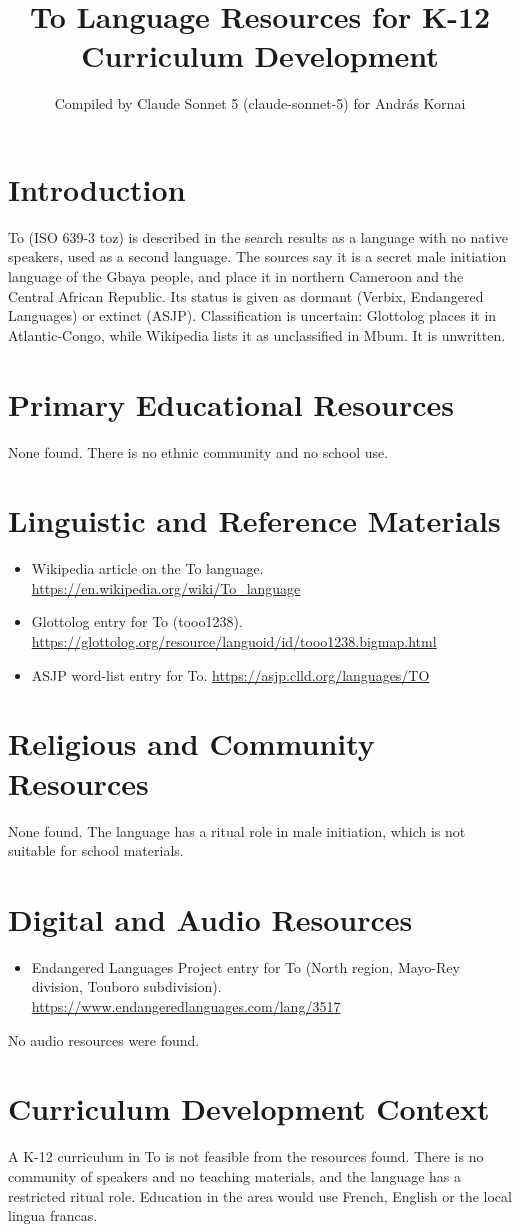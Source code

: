 \documentclass[12pt]{article}
\title{To Language Resources for K-12 Curriculum Development}
\author{Compiled by Claude Sonnet 5 (claude-sonnet-5) for Andr\'as Kornai}
\date{}
\begin{document}
\maketitle

\section{Introduction}
To (ISO 639-3 toz) is described in the search results as a language with no native speakers, used as a second language. The sources say it is a secret male initiation language of the Gbaya people, and place it in northern Cameroon and the Central African Republic. Its status is given as dormant (Verbix, Endangered Languages) or extinct (ASJP). Classification is uncertain: Glottolog places it in Atlantic-Congo, while Wikipedia lists it as unclassified in Mbum. It is unwritten.

\section{Primary Educational Resources}
None found. There is no ethnic community and no school use.

\section{Linguistic and Reference Materials}
\begin{itemize}
\item Wikipedia article on the To language. \url{https://en.wikipedia.org/wiki/To_language}
\item Glottolog entry for To (tooo1238). \url{https://glottolog.org/resource/languoid/id/tooo1238.bigmap.html}
\item ASJP word-list entry for To. \url{https://asjp.clld.org/languages/TO}
\end{itemize}

\section{Religious and Community Resources}
None found. The language has a ritual role in male initiation, which is not suitable for school materials.

\section{Digital and Audio Resources}
\begin{itemize}
\item Endangered Languages Project entry for To (North region, Mayo-Rey division, Touboro subdivision). \url{https://www.endangeredlanguages.com/lang/3517}
\end{itemize}
No audio resources were found.

\section{Curriculum Development Context}
A K-12 curriculum in To is not feasible from the resources found. There is no community of speakers and no teaching materials, and the language has a restricted ritual role. Education in the area would use French, English or the local lingua francas.
\end{document}
